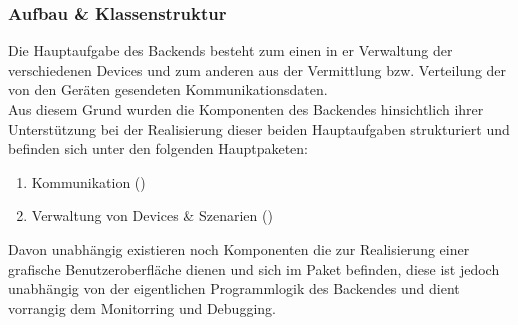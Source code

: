 \subsubsection{Aufbau \& Klassenstruktur}
Die Hauptaufgabe des Backends besteht zum einen in er Verwaltung der verschiedenen Devices und zum anderen aus der Vermittlung
bzw. Verteilung der von den Geräten gesendeten Kommunikationsdaten.
\\
Aus diesem Grund wurden die Komponenten des Backendes hinsichtlich ihrer Unterstützung bei der Realisierung dieser beiden Hauptaufgaben
strukturiert und befinden sich unter den folgenden Hauptpaketen:
\begin{enumerate}
	\item{Kommunikation ()}
	\item{Verwaltung von Devices \& Szenarien ()}
\end{enumerate}
Davon unabhängig existieren noch Komponenten die zur Realisierung einer grafische Benutzeroberfläche dienen und sich im Paket 
 befinden, diese ist jedoch 
unabhängig von der eigentlichen Programmlogik des Backendes und dient vorrangig dem Monitorring und Debugging.
